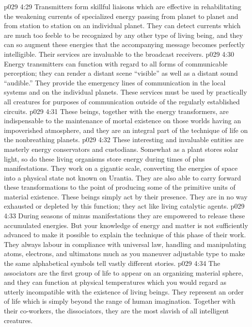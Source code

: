 \vs p029 4:29 Transmitters form skillful liaisons which are effective in rehabilitating the weakening currents of specialized energy passing from planet to planet and from station to station on an individual planet. They can detect currents which are much too feeble to be recognized by any other type of living being, and they can so augment these energies that the accompanying message becomes perfectly intelligible. Their services are invaluable to the broadcast receivers.
\vs p029 4:30 Energy transmitters can function with regard to all forms of communicable perception; they can render a distant scene “visible” as well as a distant sound “audible.” They provide the emergency lines of communication in the local systems and on the individual planets. These services must be used by practically all creatures for purposes of communication outside of the regularly established circuits.
\vs p029 4:31 These beings, together with the energy transformers, are indispensable to the maintenance of mortal existence on those worlds having an impoverished atmosphere, and they are an integral part of the technique of life on the nonbreathing planets.
\vs p029 4:32 \bibnobreakspace {} These interesting and invaluable entities are masterly energy conservators and custodians. Somewhat as a plant stores solar light, so do these living organisms store energy during times of plus manifestations. They work on a gigantic scale, converting the energies of space into a physical state not known on Urantia. They are also able to carry forward these transformations to the point of producing some of the primitive units of material existence. These beings simply act by their presence. They are in no way exhausted or depleted by this function; they act like living catalytic agents.
\vs p029 4:33 During seasons of minus manifestations they are empowered to release these accumulated energies. But your knowledge of energy and matter is not sufficiently advanced to make it possible to explain the technique of this phase of their work. They always labour in compliance with universal law, handling and manipulating atoms, electrons, and ultimatons much as you maneuver adjustable type to make the same alphabetical symbols tell vastly different stories.
\vs p029 4:34 The associators are the first group of life to appear on an organizing material sphere, and they can function at physical temperatures which you would regard as utterly incompatible with the existence of living beings. They represent an order of life which is simply beyond the range of human imagination. Together with their co\hyp{}workers, the dissociators, they are the most slavish of all intelligent creatures.
